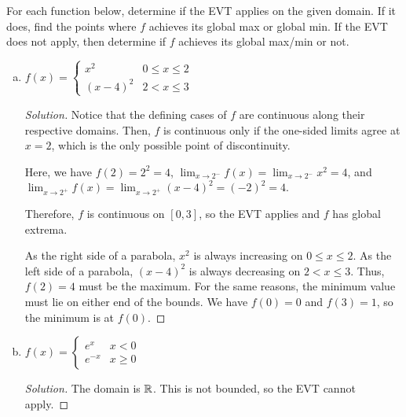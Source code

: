 \documentclass{agony}
\begin{document}
\question For each function below, determine if the EVT applies on the given domain.
If it does, find the points where $f$ achieves its global max or global min.
If the EVT does not apply, then determine if $f$ achieves its global max/min or not.
\begin{enumerate}[(a)]
  \item $f(x)=\begin{cases}
            x^2     & 0 \leq x \leq 2 \\
            (x-4)^2 & 2 < x \leq 3
          \end{cases}$
        \begin{proof}[Solution]
          Notice that the defining cases of $f$ are continuous along their respective domains.
          Then, $f$ is continuous only if the one-sided limits agree at $x=2$,
          which is the only possible point of discontinuity.

          Here, we have $f(2) = 2^2 = 4$, $\lim_{x\to2^-}f(x)=\lim_{x\to2^-}x^2=4$,
          and $\lim_{x\to2^+}f(x)=\lim_{x\to2^+}(x-4)^2=(-2)^2=4$.

          Therefore, $f$ is continuous on $[0,3]$, so the EVT applies and $f$ has global extrema.

          As the right side of a parabola, $x^2$ is always increasing on $0 \leq x \leq 2$.
          As the left side of a parabola, $(x-4)^2$ is always decreasing on $2 < x \leq 3$.
          Thus, $f(2)=4$ must be the maximum.
          For the same reasons, the minimum value must lie on either end of the bounds.
          We have $f(0) = 0$ and $f(3) = 1$, so the minimum is at $f(0)$.
        \end{proof}
  \item $f(x)=\begin{cases}
            e^x    & x < 0    \\
            e^{-x} & x \geq 0
          \end{cases}$
        \begin{proof}[Solution]
          The domain is $\mathbb{R}$.
          This is not bounded, so the EVT cannot apply.


\end{proof}
\end{enumerate}
\end{document}
